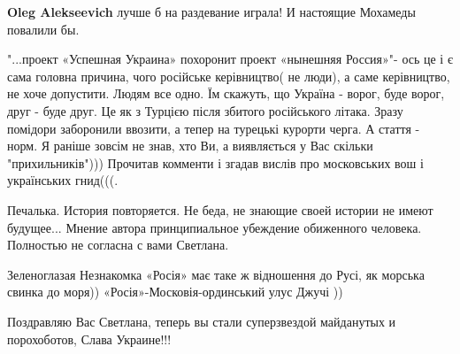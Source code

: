 \begin{itemize}
\begin{itemize}
\textbf{Oleg Alekseevich} лучше б на раздевание играла! И настоящие Мохамеды повалили бы.

\end{itemize}


 
"...проект «Успешная Украина» похоронит проект «нынешняя Россия»"- ось це і є сама головна причина, чого російське керівництво( не люди), а саме керівництво, не хоче допустити. Людям все одно. Їм скажуть, що Україна - ворог, буде ворог, друг - буде друг. Це як з Турцією після збитого російського літака. Зразу помідори заборонили ввозити, а тепер на турецькі курорти черга. А стаття - норм. Я раніше зовсім не знав, хто Ви, а виявляється у Вас скільки "прихильників"))) Прочитав комменти і згадав вислів про московських вош і українських гнид(((.

 
Печалька. История повторяется. Не беда, не знающие своей истории не имеют будущее... Мнение автора принципиальное убеждение обиженного человека. Полностью не согласна с вами Светлана.

\begin{itemize}
 
Зеленоглазая Незнакомка «Росія» має таке ж відношення до Русі, як морська свинка до моря))
«Росія»-Московія-ординський улус Джучі ))
\end{itemize}

 
Поздравляю Вас Светлана, теперь вы стали суперзвездой майданутых и порохоботов, Слава Украине!!!

\begin{itemize}
 

\end{itemize}
\end{itemize}

